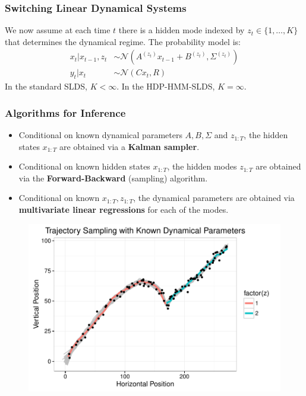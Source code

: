 \documentclass{beamer}
\begin{document}
\begin{frame}
\frametitle{Switching Linear Dynamical Systems}

We now assume at each time $t$ there is a hidden mode indexed by $z_t\in\{1,\ldots,K\}$ that determines the dynamical regime. The probability model is:
\begin{align*}
x_t|x_{t-1},z_t&\sim\mathcal{N}(A^{(z_t)}x_{t-1}+B^{(z_t)},\Sigma^{(z_t)})\\
y_t|x_t&\sim\mathcal{N}(Cx_t,R)
\end{align*}
In the standard SLDS, $K<\infty$. In the HDP-HMM-SLDS, $K=\infty$.
\end{frame}

\begin{frame}
\frametitle{Algorithms for Inference}
\begin{itemize}
\item Conditional on known dynamical parameters $A,B,\Sigma$ and $z_{1:T}$, the hidden states $x_{1:T}$ are obtained via a \textbf{Kalman sampler}.
\item Conditional on known hidden states $x_{1:T}$, the hidden modes $z_{1:T}$ are obtained via the \textbf{Forward-Backward} (sampling) algorithm.
\item Conditional on known $x_{1:T},z_{1:T}$, the dynamical parameters are obtained via \textbf{multivariate linear regressions} for each of the modes.
\end{itemize}
\end{frame}

\begin{frame}
\begin{figure}
  \centering
  \includegraphics[width = 1\linewidth]{"./plot/lds/01_projectile_known"}
\end{figure}
\end{frame}
\end{document}
